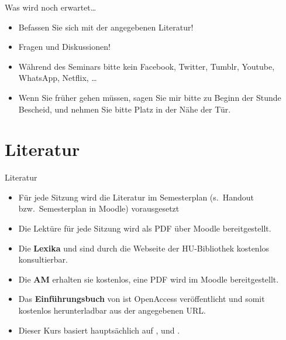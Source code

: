 \begin{frame}

Was wird noch erwartet\dots

\begin{itemize}
	\item Befassen Sie sich mit der angegebenen Literatur!
	
	\item Fragen und Diskussionen!
	
	\item Während des Seminars bitte kein Facebook, Twitter, Tumblr,
	Youtube, WhatsApp, Netflix, \dots
	
	\item Wenn Sie früher gehen müssen, sagen Sie mir bitte zu Beginn der
	Stunde Bescheid, und nehmen Sie bitte Platz in der Nähe der Tür.
	
\end{itemize}

\end{frame}


\section{Literatur}

\begin{frame}{Literatur}

\begin{itemize}
	\item Für jede Sitzung wird die Literatur im Semesterplan (s.\ Handout bzw.\ Semesterplan in Moodle) vorausgesetzt
	
	\item Die Lektüre für jede Sitzung wird als PDF über Moodle bereitgestellt.
	
	\item Die \textbf{Lexika} \citet{Glueck&Roedel16a} und \citet{Schierholz&Co18} sind durch die Webseite der HU-Bibliothek kostenlos konsultierbar.
	
	\item Die \textbf{AM} \citep{Abramowski2016} erhalten sie kostenlos, eine PDF wird im Moodle bereitgestellt.
	
	\item Das \textbf{Einführungsbuch} von \citet{SchaeferR16a} ist OpenAccess veröffentlicht und somit kostenlos herunterladbar aus der angegebenen URL.
	
\bigskip

	\item Dieser Kurs basiert hauptsächlich auf \citet{Luedeling2009}, \citet{Meibauer&Co07a} und \citet{Abramowski2016}.
\end{itemize}		

\end{frame}


